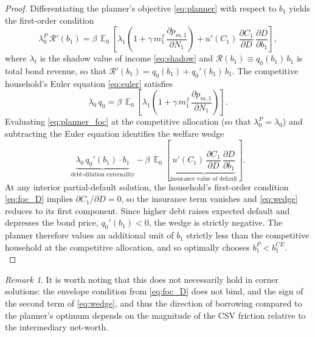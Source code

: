 \documentclass[11pt]{article}
\DeclareMathOperator{\E}{\mathbb{E}}
\theoremstyle{definition}
\theoremstyle{plain}
\theoremstyle{remark}
\newtheorem{remark}{Remark}
\begin{document}
\begin{proof}
Differentiating the planner's objective \eqref{eq:planner} with respect to $b_1$ yields the first-order condition
\begin{equation}\label{eq:planner_foc}
    \lambda_0^{P}\,\mathcal{R}'(b_1) = \beta\,\E_0\!\left[\lambda_1\!\left(1 + \gamma\,m^f_1\,\frac{\partial p_{m,1}}{\partial N_1}\right) + u'(C_1)\,\frac{\partial C_1}{\partial D}\,\frac{\partial D}{\partial b_1}\right],
\end{equation}
where $\lambda_t$ is the shadow value of income \eqref{eq:shadow} and $\mathcal{R}(b_1) \equiv q_0(b_1)\,b_1$ is total bond revenue, so that $\mathcal{R}'(b_1) = q_0(b_1) + q_0'(b_1)\,b_1$. The competitive household's Euler equation \eqref{eq:euler} satisfies
\[
    \lambda_0\,q_0 = \beta\,\E_0\!\left[\lambda_1\!\left(1 + \gamma\,m^f_1\,\frac{\partial p_{m,1}}{\partial N_1}\right)\right].
\]
Evaluating \eqref{eq:planner_foc} at the competitive allocation (so that $\lambda_0^{P} = \lambda_0$) and subtracting the Euler equation identifies the welfare wedge
\begin{equation}\label{eq:wedge}
    \underbrace{\lambda_0\,q_0'(b_1)\cdot b_1}_{\text{debt-dilution externality}} - \beta\,\E_0\!\left[\underbrace{u'(C_1)\,\frac{\partial C_1}{\partial D}\,\frac{\partial D}{\partial b_1}}_{\text{insurance value of default}}\right].
\end{equation}
At any interior partial-default solution, the household's first-order condition \eqref{eq:foc_D} implies $\partial C_1/\partial D = 0$, so the insurance term vanishes and \eqref{eq:wedge} reduces to its first component. Since higher debt raises expected default and depresses the bond price, $q_0'(b_1) < 0$, the wedge is strictly negative. The planner therefore values an additional unit of $b_1$ strictly less than the competitive household at the competitive allocation, and so optimally chooses $b_1^{P} < b_1^{CE}$. \\
\end{proof}

\begin{remark}\label{rem:corner}
It is worth noting that this does not necessarily hold in corner solutions: the envelope condition from \eqref{eq:foc_D} does not bind, and the sign of the second term of \eqref{eq:wedge}, and thus the direction of borrowing compared to the planner's optimum depends on the magnitude of the CSV friction relative to the intermediary net-worth.\\
\end{remark}
\end{document}
